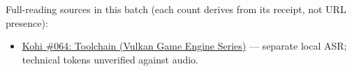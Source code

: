 Full-reading sources in this batch (each count derives from its receipt, not URL presence):

\begin{itemize}
\tightlist
\item
  \href{https://www.youtube.com/watch?v=cCEmwjfHIkY}{Kohi \#064: Toolchain (Vulkan Game Engine Series)} --- separate local ASR; technical tokens unverified against audio.
\end{itemize}
